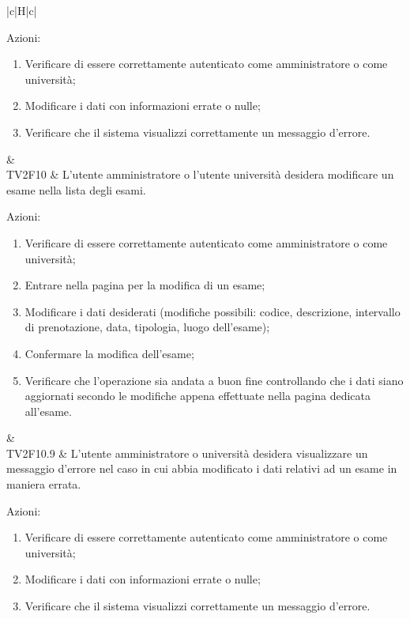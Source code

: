 \begin{longtable}{|c|H|c|}
\begin{flushleft}
			Azioni:\newline
		\end{flushleft} 
		\begin{enumerate}
			\item Verificare di essere correttamente autenticato come amministratore o come università;
			\item Modificare i dati con informazioni errate o nulle;
			\item Verificare che il sistema visualizzi correttamente un messaggio d'errore.
		\end{enumerate}  & \Tni \\
		\hline
		TV2F10 & L'utente amministratore o l'utente università desidera modificare un esame nella lista degli esami. \newline \begin{flushleft}
			Azioni:\newline
		\end{flushleft}
		\begin{enumerate}
			\item Verificare di essere correttamente autenticato come amministratore o come università;
			\item Entrare nella pagina per la modifica di un esame;
			\item Modificare i dati desiderati (modifiche possibili: codice, descrizione, intervallo di prenotazione, data, tipologia, luogo dell'esame);
			\item Confermare la modifica dell'esame;
			\item Verificare che l'operazione sia andata a buon fine controllando che i dati siano aggiornati secondo le modifiche appena effettuate nella pagina dedicata all'esame.
		\end{enumerate} & \Tni \\
		\hline
		TV2F10.9 & L'utente amministratore o università desidera visualizzare un messaggio d'errore nel caso in cui abbia modificato i dati relativi ad un esame in maniera errata. \newline \begin{flushleft}
			Azioni:\newline
		\end{flushleft} 
		\begin{enumerate}
			\item Verificare di essere correttamente autenticato come amministratore o come università;
			\item Modificare i dati con informazioni errate o nulle;
			\item Verificare che il sistema visualizzi correttamente un messaggio d'errore.

\end{enumerate}
\end{longtable}
